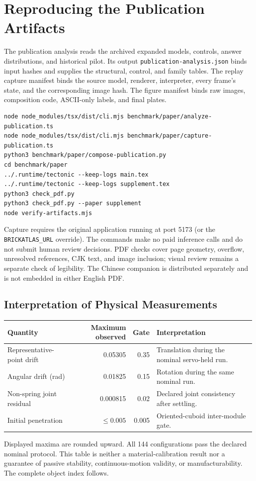 \clearpage
\section{Reproducing the Publication Artifacts}
The publication analysis reads the archived expanded models, controls,
answer distributions, and historical pilot. Its output
\texttt{publication-analysis.json} binds input hashes and supplies the
structural, control, and family tables. The replay capture manifest
binds the source model, renderer, interpreter, every frame's state,
and the corresponding image hash. The figure manifest binds raw images,
composition code, ASCII-only labels, and final plates.

\begin{verbatim}
node node_modules/tsx/dist/cli.mjs benchmark/paper/analyze-publication.ts
node node_modules/tsx/dist/cli.mjs benchmark/paper/capture-publication.ts
python3 benchmark/paper/compose-publication.py
cd benchmark/paper
../.runtime/tectonic --keep-logs main.tex
../.runtime/tectonic --keep-logs supplement.tex
python3 check_pdf.py
python3 check_pdf.py --paper supplement
node verify-artifacts.mjs
\end{verbatim}
Capture requires the original application running at port 5173
(or the \texttt{BRICKATLAS\_URL} override). The commands make no paid
inference calls and do not submit human review decisions. PDF checks
cover page geometry, overflow, unresolved references, CJK text, and
image inclusion; visual review remains a separate check of legibility.
The Chinese companion is distributed separately and is not embedded
in either English PDF.

\subsection{Interpretation of Physical Measurements}
\begin{center}\small
\begin{tabularx}{\textwidth}{lrrX}
\toprule Quantity & Maximum observed & Gate & Interpretation\\\midrule
Representative-point drift & 0.05305 & 0.35 & Translation during the nominal servo-held run.\\
Angular drift (rad) & 0.01825 & 0.15 & Rotation during the same nominal run.\\
Non-spring joint residual & 0.000815 & 0.02 & Declared joint consistency after settling.\\
Initial penetration & $\leq0.005$ & 0.005 & Oriented-cuboid inter-module gate.\\
\bottomrule
\end{tabularx}
\end{center}
Displayed maxima are rounded upward. All 144 configurations pass the
declared nominal protocol. This table is neither a material-calibration
result nor a guarantee of passive stability, continuous-motion validity,
or manufacturability. The complete object index follows.
